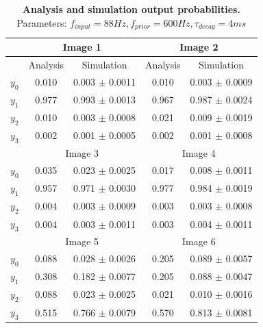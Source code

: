 \begin{table}[]
\label{tab:1D_88_600_4}
\small
\tabcolsep=0.11cm
\begin{tabular}{|c|cc|cc|}
\hline
                       & \multicolumn{2}{c|}{Image 1}                       & \multicolumn{2}{c|}{Image 2}                       \\ \hline
                       & \multicolumn{1}{c|}{Analysis} & Simulation         & \multicolumn{1}{c|}{Analysis} & Simulation         \\ \hline
$y_0$                  & \multicolumn{1}{c|}{0.010}    & 0.003 $\pm$ 0.0011 & \multicolumn{1}{c|}{0.010}    & 0.003 $\pm$ 0.0009 \\ \hline
$y_1$                  & \multicolumn{1}{c|}{0.977}    & 0.993 $\pm$ 0.0013 & \multicolumn{1}{c|}{0.967}    & 0.987 $\pm$ 0.0024 \\ \hline
$y_2$                  & \multicolumn{1}{c|}{0.010}    & 0.003 $\pm$ 0.0008 & \multicolumn{1}{c|}{0.021}    & 0.009 $\pm$ 0.0019 \\ \hline
$y_3$                  & \multicolumn{1}{c|}{0.002}    & 0.001 $\pm$ 0.0005 & \multicolumn{1}{c|}{0.002}    & 0.001 $\pm$ 0.0008 \\ \hline
                       & \multicolumn{2}{c|}{Image 3}                       & \multicolumn{2}{c|}{Image 4}                       \\ \hline
$y_0$                  & \multicolumn{1}{c|}{0.035}    & 0.023 $\pm$ 0.0025 & \multicolumn{1}{c|}{0.017}    & 0.008 $\pm$ 0.0011 \\ \hline
$y_1$                  & \multicolumn{1}{c|}{0.957}    & 0.971 $\pm$ 0.0030 & \multicolumn{1}{c|}{0.977}    & 0.984 $\pm$ 0.0019 \\ \hline
$y_2$                  & \multicolumn{1}{c|}{0.004}    & 0.003 $\pm$ 0.0009 & \multicolumn{1}{c|}{0.003}    & 0.003 $\pm$ 0.0008 \\ \hline
$y_3$                  & \multicolumn{1}{c|}{0.004}    & 0.003 $\pm$ 0.0011 & \multicolumn{1}{c|}{0.003}    & 0.004 $\pm$ 0.0011 \\ \hline
						& \multicolumn{2}{c|}{Image 5}                       & \multicolumn{2}{c|}{Image 6}                       \\ \hline
$y_0$                  & \multicolumn{1}{c|}{0.088}    & 0.028 $\pm$ 0.0026 & \multicolumn{1}{c|}{0.205}    & 0.089 $\pm$ 0.0057 \\ \hline
$y_1$                  & \multicolumn{1}{c|}{0.308}    & 0.182 $\pm$ 0.0077 & \multicolumn{1}{c|}{0.205}    & 0.088 $\pm$ 0.0047 \\ \hline
$y_2$                  & \multicolumn{1}{c|}{0.088}    & 0.023 $\pm$ 0.0025 & \multicolumn{1}{c|}{0.021}    & 0.010 $\pm$ 0.0016 \\ \hline
$y_3$                  & \multicolumn{1}{c|}{0.515}    & 0.766 $\pm$ 0.0079 & \multicolumn{1}{c|}{0.570}    & 0.813 $\pm$ 0.0081 \\ \hline
\end{tabular}
\caption{\textbf{Analysis and simulation output probabilities. } Parameters: $f_{input} = 88 Hz, f_{prior} = 600 Hz, \tau_{decay} = 4 ms$}
\end{table}

